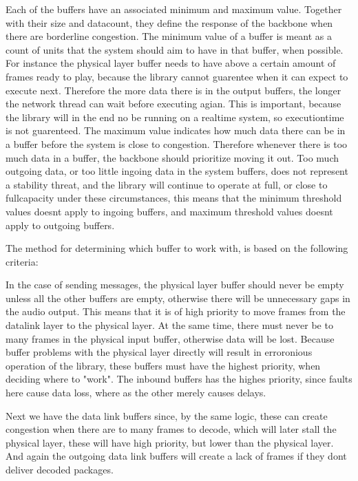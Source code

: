Each of the buffers have an associated minimum and maximum value. Together with their size and datacount, they define the response of the backbone when there are borderline congestion.
The minimum value of a buffer is meant as a count of units that the system should aim to have in that buffer, when possible. For instance the physical layer buffer needs to have above a certain amount of frames ready to play, because the library cannot guarentee when it can expect to execute next. Therefore the more data there is in the output buffers, the longer the network thread can wait before executing agian. This is important, because the library will in the end no be running on a realtime system, so executiontime is not guarenteed.
The maximum value indicates how much data there can be in a buffer before the system is close to congestion. Therefore whenever there is too much data in a buffer, the backbone should prioritize moving it out.
Too much outgoing data, or too little ingoing data in the system buffers, does not represent a stability threat, and the library will continue to operate at full, or close to fullcapacity under these circumstances, this means that the minimum threshold values doesnt apply to ingoing buffers, and maximum threshold values doesnt apply to outgoing buffers.



The method for determining which buffer to work with, is based on the following criteria:

In the case of sending messages, the physical layer buffer should never be empty unless all the other buffers are empty, otherwise there will be unnecessary gaps in the audio output. This means that it is of high priority to move frames from the datalink layer to the physical layer.
At the same time, there must never be to many frames in the physical input buffer, otherwise data will be lost. Because buffer problems with the physical layer directly will result in erroronious operation of the library, these buffers must have the highest priority, when deciding where to "work". The inbound buffers has the highes priority, since faults here cause data loss, where as the other merely causes delays.

Next we have the data link buffers since, by the same logic, these can create congestion when there are to many frames to decode, which will later stall the physical layer, these will have high priority, but lower than the physical layer.
And again the outgoing data link buffers will create a lack of frames if they dont deliver decoded packages.

